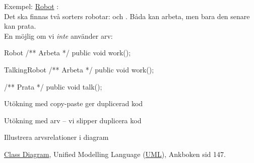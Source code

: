 \documentclass{lecturenotes}
\begin{document}
\begin{Slide}{Exempel: \href{https://www.youtube.com/watch?v=VXa9tXcMhXQ}{Robot}}
: \\ Det ska finnas två sorters robotar:  och . Båda kan arbeta, men bara den senare kan prata.
\\ \vspace{1em}
En möjlig  om vi \textit{inte} använder arv:

\begin{ClassSpec}{Robot}
/** Arbeta */
public void work();
\end{ClassSpec}

\begin{ClassSpec}{TalkingRobot}
/** Arbeta */
public void work();

/** Prata */
public void talk();
\end{ClassSpec}
\end{Slide}

\begin{Slide}{Utökning med copy-paste ger duplicerad kod}\footnotesize

\end{Slide}

\begin{Slide}{Utökning med arv -- vi slipper duplicera kod}\footnotesize

\end{Slide}

\begin{Slide}{Illustrera arvsrelationer i diagram}
\begin{center}
\end{center}
\vspace{2em} 
\centerline{\scriptsize\href{https://en.wikipedia.org/wiki/Class_diagram}{Class Diagram}, Unified Modelling Language (\href{https://sv.wikipedia.org/wiki/Unified\_Modeling\_Language}{UML}), Ankboken sid 147.}
\end{Slide}
\end{document}
